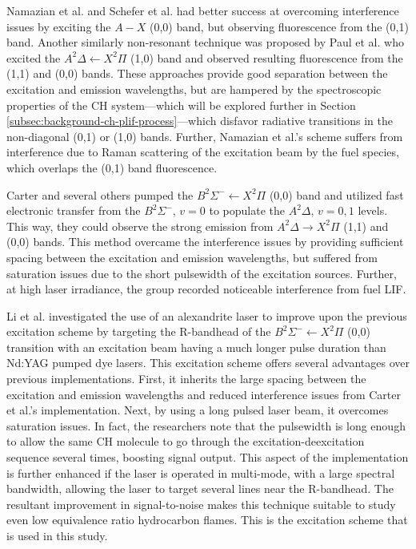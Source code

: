 Namazian et al.\cite{1986-namazian} and Schefer et al.\cite{1994-schefer} had better success at overcoming interference issues by exciting the \(A-X\) (0,0) band, but observing fluorescence from the (0,1) band.
Another similarly non-resonant technique was proposed by Paul et al.\cite{1994-paul} who excited the \(A^2\Delta\leftarrow X^2\Pi\) (1,0) band and observed resulting fluorescence from the (1,1) and (0,0) bands.
These approaches provide good separation between the excitation and emission wavelengths, but are hampered by the spectroscopic properties of the CH system---which will be explored further in Section \ref{subsec:background-ch-plif-process}---which disfavor radiative transitions in the non-diagonal (0,1) or (1,0) bands.
Further, Namazian et al.'s scheme suffers from interference due to Raman scattering of the excitation beam by the fuel species, which overlaps the (0,1) band fluorescence.

Carter and several others\cite{1998-carter,1999-watson,2000-watson,2000-donbar,2000-han,2002-kothnur,2003-han-a,2003-han-b,2003-sutton} pumped the \(B^2\Sigma^-\leftarrow X^2\Pi\) (0,0) band and utilized fast electronic transfer from the \(B^2\Sigma^-\), \(v=0\) to populate the \(A^2\Delta\), \(v=0,1\) levels.
This way, they could observe the strong emission from \(A^2\Delta\rightarrow X^2\Pi\) (1,1) and (0,0) bands.
This method overcame the interference issues by providing sufficient spacing between the excitation and emission wavelengths, but suffered from saturation issues due to the short pulsewidth of the excitation sources.
Further, at high laser irradiance, the group recorded noticeable interference from fuel LIF.

Li et al.\cite{2007-li-a,2007-li-b,2007-kiefer} investigated the use of an alexandrite laser\cite{2004-li} to improve upon the previous excitation scheme by targeting the R-bandhead of the \(B^2\Sigma^-\leftarrow X^2\Pi\) (0,0) transition with an excitation beam having a much longer pulse duration than Nd:YAG pumped dye lasers.
This excitation scheme offers several advantages over previous implementations.
First, it inherits the large spacing between the excitation and emission wavelengths and reduced interference issues from Carter et al.'s implementation.
Next, by using a long pulsed laser beam, it overcomes saturation issues.
In fact, the researchers note that the pulsewidth is long enough to allow the same CH molecule to go through the excitation-deexcitation sequence several times, boosting signal output.
This aspect of the implementation is further enhanced if the laser is operated in multi-mode, with a large spectral bandwidth, allowing the laser to target several lines near the R-bandhead.
The resultant improvement in signal-to-noise makes this technique suitable to study even low equivalence ratio hydrocarbon flames.
This is the excitation scheme that is used in this study.

